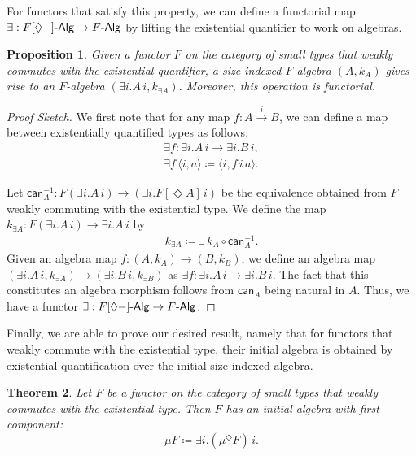 \documentclass[10pt,a4paper]{article}
\newtheorem{theorem}{Theorem}
\newtheorem{proposition}[theorem]{Proposition}
\theoremstyle{definition}
\theoremstyle{remark}
\renewcommand{\.}{.\,} %
\renewcommand{\:}{:} %
\newcommand{\F}{F}
\newcommand{\FAlg}{F\text-\sf{Alg}}
\newcommand{\sFAlg}{F[\Diamond{-}]\text-\sf{Alg}}
\newcommand{\sto}{\overset{i}{\to}}
\newcommand{\0}{\mathbf{0}}
\newcommand{\1}{\mathbf{1}}
\newcommand\<\langle
\renewcommand\>\rangle
\renewcommand\sf\mathsf
\theoremstyle{remark}
\begin{document}
For functors that satisfy this property, we can define a functorial map $\exists : F[\Diamond{-}]\text-\sf{Alg} \to F\text-\sf{Alg}$ by lifting the existential quantifier to work on algebras.
\begin{proposition}
    Given a functor $F$ on the category of small types that weakly commutes with the existential quantifier, a size-indexed $F$-algebra $(A, k_A)$ gives rise to an $F$-algebra $(\exists i . A \, i, k_{\exists A})$. Moreover, this operation is functorial.
\end{proposition}
\begin{proof}[Proof Sketch]
    We first note that for any map $f : A \sto B$, we can define a map between existentially quantified types as follows:
    \begin{align*}
        \exists f : \exists i . A \, i \to \exists i . B \, i, \\
        \exists f \, \langle i, a \rangle \coloneq  \langle i, f \, i \, a \rangle.
    \end{align*}

    Let $\mathsf{can}^{-1}_A : F(\exists i . A \, i) \to (\exists i . F [\Diamond A] \, i) $ be the equivalence obtained from $F$ weakly commuting with the existential type. We define the map $k_{\exists A} : F (\exists i . A \, i) \to \exists i. A \, i$ by
    \begin{align*}
    k_{\exists A}  \coloneq  \exists \, k_A \circ \mathsf{can}^{-1}_A.
    \end{align*}
    Given an algebra map $f :(A, k_A) \to (B, k_B)$, we define an algebra map $(\exists i . A \, i, k_{\exists A}) \to (\exists i . B \, i, k_{\exists B})$ as $\exists f : \exists i . A \, i \to \exists i . B \, i$.
    The fact that this constitutes an algebra morphism follows from $\mathsf{can}_A$ being natural in $A$. Thus, we have a functor $\exists : \sFAlg \to \FAlg$.
\end{proof}

Finally, we are able to prove our desired result, namely that for functors that weakly commute with the existential type, their initial algebra is obtained by existential quantification over the initial size-indexed algebra.

\begin{theorem}\label{theorem:inductive-construction}
    Let $\F$ be a functor on the category of small types that weakly commutes with the existential type. Then $\F$ has an initial algebra with first component:
    \[
    \mu  \F \coloneq  \exists i . (\mu^\Diamond F) \, i.
    \]
\end{theorem}
\end{document}

